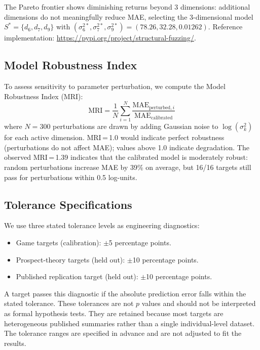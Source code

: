 \documentclass[journal]{IEEEtran}
\begin{document}
The Pareto frontier shows diminishing returns beyond 3 dimensions: additional dimensions do not meaningfully reduce MAE, selecting the 3-dimensional model $S^*=\{d_6,d_7,d_9\}$ with $(\sigma_6^{2*},\sigma_7^{2*},\sigma_9^{2*})=(78.26, 32.28, 0.01262)$.
Reference implementation: \url{https://pypi.org/project/structural-fuzzing/}.

\subsection{Model Robustness Index}

To assess sensitivity to parameter perturbation, we compute the Model Robustness Index (MRI):
\begin{equation}
    \text{MRI} = \frac{1}{N} \sum_{i=1}^{N} \frac{\text{MAE}_{\text{perturbed},i}}{\text{MAE}_{\text{calibrated}}}
    \label{eq:mri}
\end{equation}
where $N = 300$ perturbations are drawn by adding Gaussian noise to $\log(\sigma_k^2)$ for each active dimension.
MRI\,=\,1.0 would indicate perfect robustness (perturbations do not affect MAE); values above 1.0 indicate degradation.
The observed MRI\,=\,1.39 indicates that the calibrated model is moderately robust: random perturbations increase MAE by 39\% on average, but 16/16 targets still pass for perturbations within 0.5 log-units.


\subsection{Tolerance Specifications}

We use three stated tolerance levels as engineering diagnostics:
\begin{itemize}
    \item Game targets (calibration): $\pm$5 percentage points.
    \item Prospect-theory targets (held out): $\pm$10 percentage points.
    \item Published replication target (held out): $\pm$10 percentage points.
\end{itemize}
A target passes this diagnostic if the absolute prediction error falls within the stated tolerance.
These tolerances are not $p$ values and should not be interpreted as formal hypothesis tests.
They are retained because most targets are heterogeneous published summaries rather than a single individual-level dataset.
The tolerance ranges are specified in advance and are not adjusted to fit the results.
\end{document}
